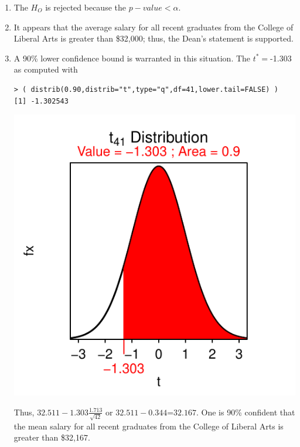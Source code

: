 \documentclass[10pt,openany]{book}\usepackage[]{graphicx}\usepackage[]{color}
\makeatletter
\newenvironment{kframe}{%
 \def\at@end@of@kframe{}%
 \ifinner\ifhmode%
  \def\at@end@of@kframe{\end{minipage}}%
  \begin{minipage}{\columnwidth}%
 \fi\fi%
 \def\FrameCommand##1{\hskip\@totalleftmargin \hskip-\fboxsep
 \colorbox{shadecolor}{##1}\hskip-\fboxsep
     \hskip-\linewidth \hskip-\@totalleftmargin \hskip\columnwidth}%
 \MakeFramed {\advance\hsize-\width
   \@totalleftmargin\z@ \linewidth\hsize
   \@setminipage}}%
 {\par\unskip\endMakeFramed%
 \at@end@of@kframe}
\newenvironment{knitrout}{}{} %
\makeatother
\begin{document}
\begin{itemize}
\begin{enumerate}
\begin{knitrout}
{}



\end{knitrout}
      \item The $H_{O}$ is rejected because the $p-value<\alpha$.
      \item It appears that the average salary for all recent graduates from the College of Liberal Arts is greater than \$32,000; thus, the Dean's statement is supported.
      \item A 90\% lower confidence bound is warranted in this situation.  The $t^{*}=$-1.303 as computed with
\begin{knitrout}
\color{fgcolor}\begin{kframe}
\begin{verbatim}
> ( distrib(0.90,distrib="t",type="q",df=41,lower.tail=FALSE) )
[1] -1.302543
\end{verbatim}
\end{kframe}

{\centering \includegraphics[width=.4\linewidth]{Figs/unnamed-chunk-363-1} 

}



\end{knitrout}
Thus, $32.511-1.303\frac{1.713}{\sqrt{42}}$ or $32.511-0.344$=$32.167$.  One is 90\% confident that the mean salary for all recent graduates from the College of Liberal Arts is greater than \$32,167.
    \end{enumerate}


\end{itemize}
\end{document}
